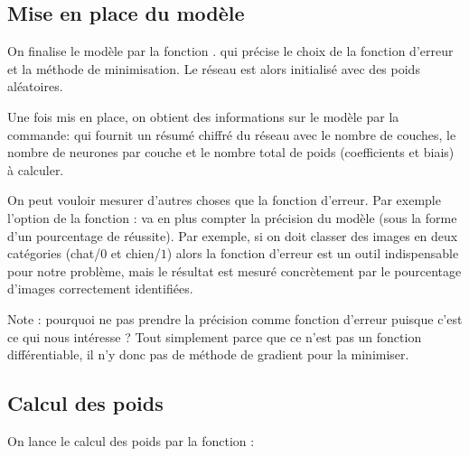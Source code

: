 \documentclass[11pt,class=report,crop=false]{standalone}
\begin{document}
  

\subsection{Mise en place du modèle}

On finalise le modèle par la fonction .
qui précise le choix de la fonction d'erreur et la méthode de minimisation.
Le réseau est alors initialisé avec des poids aléatoires.

Une fois mis en place, on obtient des informations sur le modèle par la commande:
qui fournit un résumé chiffré du réseau avec le nombre de couches, le nombre de neurones par couche et le nombre total de poids (coefficients et biais) à calculer. 

On peut vouloir mesurer d'autres choses que la fonction d'erreur.
Par exemple l'option  de la fonction  : 
va en plus compter la précision du modèle (sous la forme d'un pourcentage de réussite).
Par exemple, si on doit classer des images en deux catégories (chat/$0$ et chien/$1$) alors la fonction d'erreur est un outil indispensable pour notre problème, mais le résultat est mesuré concrètement par le pourcentage d'images correctement identifiées.

Note : pourquoi ne pas prendre la précision comme fonction d'erreur puisque c'est ce qui nous intéresse ? Tout simplement parce que ce n'est pas un fonction différentiable, il n'y donc pas de méthode de gradient pour la minimiser.


\subsection{Calcul des poids}

On lance le calcul des poids par la fonction  :

\end{document}
